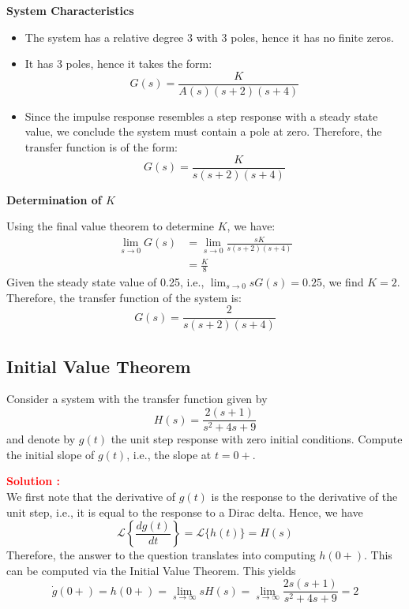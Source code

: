 \documentclass[12pt]{article}
\begin{document}
\textbf{System Characteristics}
\begin{itemize}
    \item The system has a relative degree 3 with 3 poles, hence it has no finite zeros.
    \item It has 3 poles, hence it takes the form:
    \begin{equation}
    G(s) = \frac{K}{A(s)(s + 2)(s + 4)}
    \end{equation}
    \item Since the impulse response resembles a step response with a steady state value, we conclude the system must contain a pole at zero. Therefore, the transfer function is of the form:
    \begin{equation}
    G(s) = \frac{K}{s(s + 2)(s + 4)}
    \end{equation}
\end{itemize}

\textbf{Determination of \(K\)}

Using the final value theorem to determine \(K\), we have:
\begin{align}
\lim_{s \to 0} G(s) &= \lim_{s \to 0} \frac{sK}{s(s + 2)(s + 4)} \\
&= \frac{K}{8}
\end{align}
Given the steady state value of 0.25, i.e., \(\lim_{s \to 0} sG(s) = 0.25\), we find \(K = 2\).
Therefore, the transfer function of the system is:
\begin{equation}
G(s) = \frac{2}{s(s + 2)(s + 4)}
\end{equation}

\clearpage
\subsection{Initial Value Theorem}

Consider a system with the transfer function given by
\begin{equation}
H(s) = \frac{2(s + 1)}{s^2 + 4s + 9}
\end{equation}
and denote by \(g(t)\) the unit step response with zero initial conditions. Compute the initial slope of \(g(t)\), i.e., the slope at \(t = 0+\).

\textbf{\textcolor{red}{Solution :}} \\
We first note that the derivative of \(g(t)\) is the response to the derivative of the unit step, i.e., it is equal to the response to a Dirac delta. Hence, we have
\begin{equation}
\mathcal{L}\left\{ \frac{dg(t)}{dt} \right\} = \mathcal{L}\{h(t)\} = H(s)
\end{equation}
Therefore, the answer to the question translates into computing \(h(0+)\). This can be computed via the Initial Value Theorem. This yields
\begin{equation}
\dot{g}(0+) = h(0+) = \lim_{s \to \infty} sH(s) = \lim_{s \to \infty} \frac{2s(s + 1)}{s^2 + 4s + 9} = 2
\end{equation}
\end{document}
